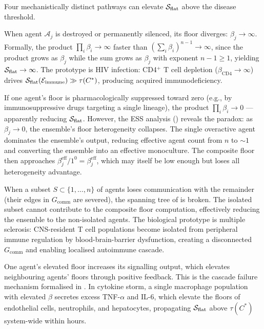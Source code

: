 Four mechanistically distinct pathways can elevate $\mathcal{S}_{\mathrm{flat}}$
above the disease threshold.

\begin{description}[leftmargin=2em, style=nextline]
  \item[Mechanism I — Single-agent knockout ($\beta_j \to \infty$).]
    When agent $\mathcal{A}_j$ is destroyed or permanently silenced, its
    floor diverges: $\beta_j \to \infty$.  Formally, the product
    $\prod_i \beta_i \to \infty$ faster than $(\sum_i \beta_i)^{n-1}
    \to \infty$, since the product grows as $\beta_j$ while the sum grows
    as $\beta_j$ with exponent $n-1 \geq 1$, yielding
    $\mathcal{S}_{\mathrm{flat}} \to \infty$.  The prototype is HIV infection:
    CD4$^+$ T cell depletion ($\beta_{\mathrm{CD4}} \to \infty$) drives
    $\mathcal{S}_{\mathrm{flat}}(\mathcal{E}_{\mathrm{immune}}) \gg \tau(C^*)$,
    producing acquired immunodeficiency.

  \item[Mechanism II — Single-agent overactivation ($\beta_j \to 0$).]
    If one agent's floor is pharmacologically suppressed toward zero (e.g.,
    by immunosuppressive drugs targeting a single lineage), the product
    $\prod_i \beta_i \to 0$ — apparently reducing $\mathcal{S}_{\mathrm{flat}}$.
    However, the ESS analysis () reveals
    the paradox: as $\beta_j \to 0$, the ensemble's floor heterogeneity
    collapses.  The single overactive agent dominates the ensemble's output,
    reducing effective agent count from $n$ to $\sim 1$ and converting the
    ensemble into an effective monoculture.  The composite floor then
    approaches $\beta_j^{\mathrm{eff}}/1^0 = \beta_j^{\mathrm{eff}}$, which
    may itself be low enough but loses all heterogeneity advantage.

  \item[Mechanism III — Subset isolation (communication graph disconnection).]
    When a subset $S \subset \{1, \ldots, n\}$ of agents loses communication
    with the remainder (their edges in $G_{\mathrm{comm}}$ are severed), the
    spanning tree of  is broken.  The
    isolated subset cannot contribute to the composite floor computation,
    effectively reducing the ensemble to the non-isolated agents.  The
    biological prototype is multiple sclerosis: CNS-resident T cell
    populations become isolated from peripheral immune regulation by
    blood-brain-barrier dysfunction, creating a disconnected
    $G_{\mathrm{comm}}$ and enabling localised autoimmune cascade.

  \item[Mechanism IV — Cascade amplification (cytokine storm).]
    One agent's elevated floor increases its signalling output, which
    elevates neighbouring agents' floors through positive feedback.  This is
    the cascade failure mechanism formalised in .
    In cytokine storm, a single macrophage population with elevated $\beta$
    secretes excess TNF-$\alpha$ and IL-6, which elevate the floors of
    endothelial cells, neutrophils, and hepatocytes, propagating
    $\mathcal{S}_{\mathrm{flat}}$ above $\tau(C^*)$ system-wide within hours.
\end{description}

